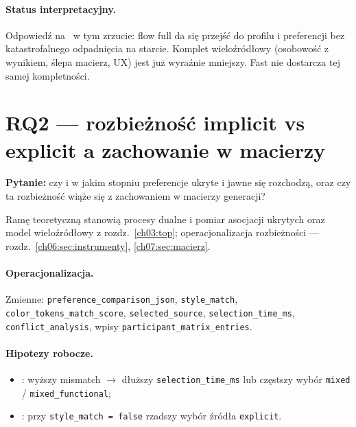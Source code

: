\paragraph{Status interpretacyjny.}
Odpowiedź na~ w tym zrzucie: flow full da się przejść do profilu i preferencji bez katastrofalnego odpadnięcia na starcie. Komplet wieloźródłowy (osobowość z wynikiem, ślepa macierz, UX) jest już wyraźnie mniejszy. Fast nie dostarcza tej samej kompletności.

\section{RQ2 --- rozbieżność implicit vs explicit a zachowanie w macierzy}
\label{ch08:sec:rq2}

\textbf{Pytanie:} czy i w jakim stopniu preferencje ukryte i jawne się rozchodzą, oraz czy ta rozbieżność wiąże się z zachowaniem w macierzy generacji?

Ramę teoretyczną stanowią procesy dualne i pomiar asocjacji ukrytych \parencite{kahneman2011thinking,greenwald1998iat} oraz model wieloźródłowy z rozdz.~\ref{ch03:top}; operacjonalizacja rozbieżności --- rozdz.~\ref{ch06:sec:instrumenty}, \ref{ch07:sec:macierz}.

\paragraph{Operacjonalizacja.}
Zmienne: \texttt{preference\_comparison\_json}, \texttt{style\_match}, \texttt{color\_tokens\_match\_score}, \texttt{selected\_source}, \texttt{selection\_time\_ms}, \texttt{conflict\_analysis}, wpisy \texttt{participant\_matrix\_entries}.

\paragraph{Hipotezy robocze.}
\begin{itemize}
  \item {}: wyższy mismatch $\rightarrow$ dłuższy \texttt{selection\_time\_ms} lub częstszy wybór \texttt{mixed} / \texttt{mixed\_functional};
  \item {}: przy \texttt{style\_match = false} rzadszy wybór źródła \texttt{explicit}.
\end{itemize}

